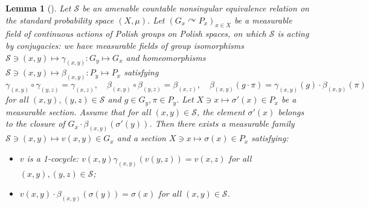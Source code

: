 \documentclass[11pt,a4paper]{article}
\newtheorem{lemma}[theorem]{Lemma}
\theoremstyle{definition}
\theoremstyle{remark}
\numberwithin{equation}{section}
\numberwithin{theorem}{section}
\newcommand{\acts}{\curvearrowright}
\begin{document}
\begin{lemma}[{\cite[Theorem 3.5]{PopaShlyakhtenkoVaes20}}] \label{lemma:cohomology_lemma}
Let $\mathcal{S}$ be an amenable countable nonsingular equivalence relation on the standard probability space $(X,\mu)$.
Let $(G_x \acts P_x)_{x \in X}$ be a measurable field of continuous actions of Polish groups on Polish spaces, on which $\mathcal{S}$ is acting by conjugacies: we have measurable fields of group isomorphisms ${\mathcal{S} \ni (x,y) \mapsto \gamma_{(x,y)}\colon G_y \mapsto G_x}$ and homeomorphisms $\mathcal{S} \ni (x,y) \mapsto \beta_{(x,y)}\colon P_y \mapsto P_x$ satisfying 
\[
\gamma_{(x,y)} \circ \gamma_{(y,z)} = \gamma_{(x,z)}, \quad \beta_{(x,y)} \circ \beta_{(y,z)} = \beta_{(x,z)}, \quad \beta_{(x,y)} (g \cdot \pi) = \gamma_{(x,y)}(g) \cdot \beta_{(x,y)}(\pi)
\]
for all $(x,y), (y,z) \in \mathcal{S}$ and $g \in G_y, \pi \in P_y$.
Let $X \ni x \mapsto \sigma'(x) \in P_x$ be a measurable section. Assume that for all $(x,y) \in \mathcal{S}$, the element $\sigma'(x)$ belongs to the closure of ${G_x \cdot \beta_{(x,y)}(\sigma'(y))}$. 
%
Then there exists a measurable family $\mathcal{S} \ni (x,y) \mapsto v(x,y) \in G_x$ and a section $X \ni x \mapsto \sigma(x) \in P_x$ satisfying:
\begin{itemize}
\item $v$ is a 1-cocycle: $v(x,y) \gamma_{(x,y)}(v(y,z)) = v(x,z)$ for all $(x,y), (y,z)\in \mathcal{S}$;
\item $v(x,y)\cdot \beta_{(x,y)}(\sigma(y)) = \sigma(x)$ for all $(x,y) \in \mathcal{S}$.
\end{itemize}
\end{lemma}
\end{document}

